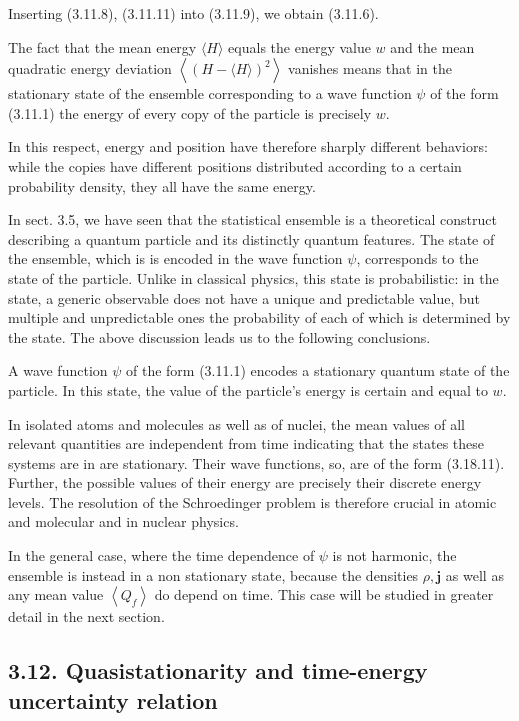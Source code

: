 \documentclass{article}
\begin{document}
Inserting (3.11.8), (3.11.11) into (3.11.9), we obtain (3.11.6).

The fact that the mean energy $\langle H\rangle$ equals the energy value $w$ and the mean quadratic energy deviation $\left\langle(H-\langle H\rangle)^{2}\right\rangle$ vanishes means that
in the stationary state of the ensemble corresponding to a wave function $\psi$ of the form (3.11.1) the energy of every copy of the particle is precisely $w$.

In this respect, energy and position have therefore sharply different behaviors: while the copies have different positions distributed according to a certain probability density, they all have the same energy.

In sect. 3.5, we have seen that the statistical ensemble is a theoretical construct describing a quantum particle and its distinctly quantum features. The state of the ensemble, which is is encoded in the wave function $\psi$, corresponds to the state of the particle. Unlike in classical physics, this state is probabilistic: in the state, a generic observable does not have a unique and predictable value, but multiple and unpredictable ones the probability of each of which is determined by the state. The above discussion leads us to the following conclusions.

A wave function $\psi$ of the form (3.11.1) encodes a stationary quantum state of the particle. In this state, the value of the particle's energy is certain and equal to $w$.

In isolated atoms and molecules as well as of nuclei, the mean values of all relevant quantities are independent from time indicating that the states these systems are in are stationary. Their wave functions, so, are of the form (3.18.11). Further, the possible values of their energy are precisely their discrete energy levels. The resolution of the Schroedinger problem is therefore crucial in atomic and molecular and in nuclear physics.

In the general case, where the time dependence of $\psi$ is not harmonic, the ensemble is instead in a non stationary state, because the densities $\rho, \boldsymbol{j}$ as well
as any mean value $\left\langle Q_{f}\right\rangle$ do depend on time. This case will be studied in greater detail in the next section.

\subsection*{3.12. Quasistationarity and time-energy uncertainty relation}
\end{document}
